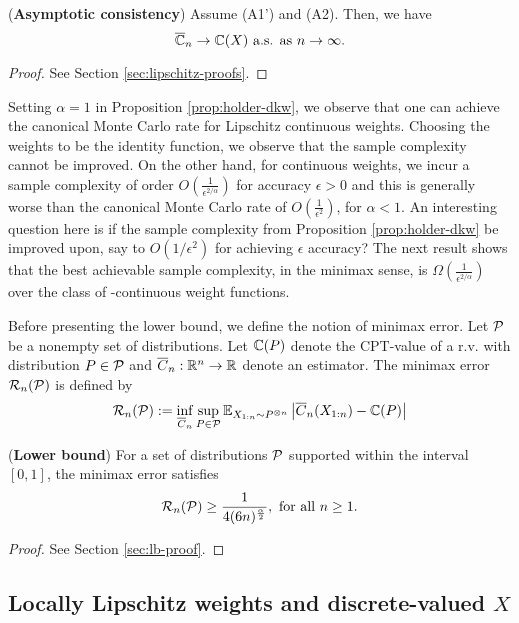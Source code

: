 \begin{proposition}(\textbf{Asymptotic consistency})
\label{prop:lipschitz}
Assume (A1') and (A2). Then, we have 
$$\overline {\mathbb{C}}_n
\rightarrow
\mathbb{C}(X)
 \text{   a.s. as } n\rightarrow \infty.
$$
\end{proposition}
\begin{proof}
See Section \ref{sec:lipschitz-proofs}.
\end{proof}

Setting $\alpha=1$ in Proposition \ref{prop:holder-dkw}, we observe that one can achieve the canonical Monte Carlo rate for Lipschitz continuous weights. Choosing the weights to be the identity function, we observe that the sample complexity cannot be improved.
 On the other hand, for \holder continuous weights, we incur a sample complexity of order $O\left(\frac1{\epsilon^{2/\alpha}}\right)$ for accuracy $\epsilon>0$ and this is generally worse than the canonical Monte Carlo rate of $O\left(\frac1{\epsilon^2}\right)$, for $\alpha < 1$. 
An interesting question here is if the sample complexity from Proposition \ref{prop:holder-dkw} be improved upon, say to $O(1/\epsilon^2)$ for achieving $\epsilon$ accuracy? The next result shows that the best achievable sample complexity, in the minimax sense, is $\Omega\left(\frac{1}{\epsilon^{2/\alpha}}\right)$ over the class of \holderNS-continuous weight functions. 

Before presenting the lower bound, we define the notion of minimax error. 
Let $\mathcal{P}$ be a nonempty set of distributions. Let $\mathbb{C}(P)$ denote the CPT-value of a r.v. with distribution $P \in \mathcal{P}$ and $\overline C_n:\mathbb{R}^n \to \mathbb{R}$ denote an estimator. The minimax error $\mathcal{R}_n(\mathcal{P})$ is defined by
\begin{align}
 \mathcal{R}_n(\mathcal{P}) := \inf_{\overline C_n} \sup_{P \in \mathcal{P}} \mathbb{E}_{X_{1:n} \sim P^{\otimes n}} \left| \overline C_n(X_{1:n}) - \mathbb{C}(P) \right| 
\end{align}


\begin{proposition}(\textbf{Lower bound})
	\label{prop:lower-bound}
For a set of distributions $\mathcal{P}$ supported within the interval $[0,1]$,  the minimax error satisfies 
$$ \mathcal{R}_n(\mathcal{P}) \ge \frac1{4(6n)^{\frac{\alpha}{2}}}, \text{ for all } n\ge1.$$
\end{proposition}
\begin{proof}
	See Section \ref{sec:lb-proof}.
\end{proof}


\subsection{Locally Lipschitz weights and discrete-valued $X$}

